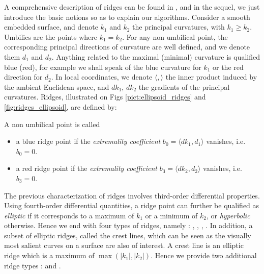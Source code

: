 A comprehensive description of ridges can be found in
\cite{hgyg-ttdpf-99,ip-gd-01}, and in the sequel, we just
introduce the basic notions so as to explain our algorithms.
Consider a smooth embedded surface, and denote $k_1$ and $k_2$ the
principal curvatures, with $k_1\geq k_2$. Umbilics are the points
where $k_1=k_2$.  For any non umbilical point, the corresponding
principal directions of curvature are well defined, and we denote them
$d_1$ and $d_2$. 
Anything related to the maximal (minimal) curvature is qualified blue
(red), for example we shall speak of the blue curvature for $k_1$ or
the red direction for $d_2$.
In local coordinates, we denote $\langle , \rangle$
the inner product induced by the ambient Euclidean space, and $dk_1$,
$dk_2$ the gradients of the principal curvatures. Ridges, illustrated
on Figs \ref{pict:ellipsoid_ridges} and \ref{fig:ridges_ellipsoid},
are defined by:
\begin{definition}
\label{def:ridge-extrema}
A non umbilical point is called
\begin{itemize}
\item
a blue ridge point if the {\em extremality coefficient} $b_0=\langle
dk_1,d_1 \rangle$ vanishes, i.e. $b_0=0$.

\item
a red ridge point if the {\em extremality coefficient} $b_3=\langle
dk_2,d_2 \rangle$ vanishes, i.e. $b_3=0$.

\end{itemize}
\end{definition}
The previous characterization of ridges involves third-order
differential properties. Using fourth-order differential quantities, a
ridge point can further be qualified as {\em elliptic} if it
corresponds to a maximum of $k_1$ or a minimum of $k_2$, or {\em
hyperbolic} otherwise. Hence we end with four types of ridges, namely
: , , ,
.
In addition, a subset of elliptic ridges, called the crest lines,
which can be seen as the visually most salient curves on a surface are
also of interest. A crest line is an elliptic ridge which is a maximum
of $\max(|k_1|,|k_2|)$. Hence we provide two additional ridge types :
 and .

